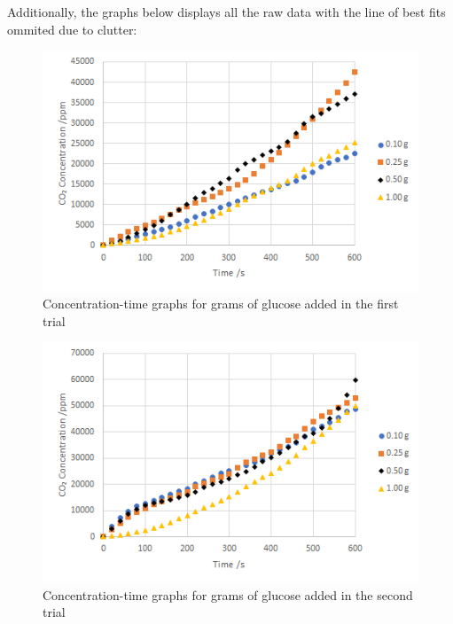 \documentclass{article}
\begin{document}
Additionally, the graphs below displays all the raw data with the line of best fits ommited due to clutter:
\begin{figure}[H]
    \renewcommand{\figurename}{Graph}
    \setcounter{figure}{2}
    \centering
    \includegraphics{figures/graph_03.png}
    \vspace*{-12pt}
    \caption{Concentration-time graphs for grams of glucose added in the first trial}
    \label{fig:graph3}
\end{figure}

\begin{figure}[H]
    \renewcommand{\figurename}{Graph}
    \setcounter{figure}{3}
    \centering
    \includegraphics{figures/graph_04.png}
    \vspace*{-12pt}
    \caption{Concentration-time graphs for grams of glucose added in the second trial}
    \label{fig:graph4}
\end{figure}
\end{document}
